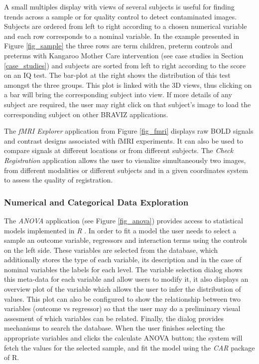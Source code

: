 \documentclass{frontiersHLTH}
\begin{document}
A small multiples display \cite{tufte_visual_1983} with views  of several subjects is useful for finding trends across a sample or for quality control to detect contaminated images. Subjects are ordered from left to right according to a chosen numerical variable and each row corresponds to a nominal variable. In the example presented in Figure \ref{fig_sample} the three rows are term children, preterm controls and preterms with Kangaroo Mother Care intervention (see case studies in Section \ref{case_studies}) and subjects are sorted from left to right according to the score on an IQ test. The bar-plot at the right shows the distribution of this test amongst the three groups. This plot is linked with the 3D views, thus clicking on a bar will bring the corresponding subject into view. If more details of any subject are required, the user may right click on that subject’s image to load the corresponding subject on other BRAVIZ applications.

The \emph{fMRI Explorer} application from Figure \ref{fig_fmri} displays raw BOLD signals and contrast designs associated with fMRI experiments. It can also be used to compare signals at different locations or from different subjects. The \emph{Check Registration} application allows the user to visualize simultaneously two images, from different modalities or different subjects and in a given coordinates system to assess the quality of registration.

\subsubsection{Numerical and Categorical Data Exploration}

The \emph{ANOVA} application (see Figure \ref{fig_anova}) provides access to statistical models implemented in \emph{R} \cite{team_r:_2012}. In order to fit a model the user needs to select a sample an outcome variable, regressors and interaction terms using the controls on the left side. These variables are selected from the database, which additionally stores the type of each variable, its description and in the case of nominal variables the labels for each level. The variable selection dialog shows this meta-data for each variable and allow users to modify it, it also displays an overview plot of the variable which allows the user to infer the distribution of values. This plot can also be configured to show the relationship between two variables (outcome vs regressor) so that the user may do a preliminary visual assesment of which variables can be related. Finally, the dialog provides mechanisms to search the database. When the user finishes selecting the appropriate variables and clicks the calculate ANOVA button; the system will fetch the values for the selected sample, and fit the model using the \emph{CAR} package of R. 
\end{document}
